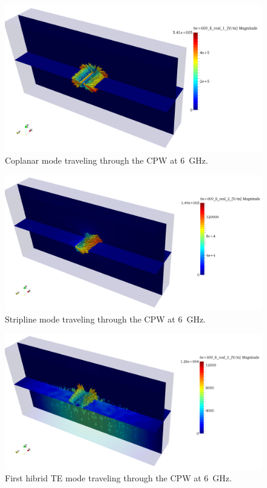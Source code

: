 \begin{figure}[h!]
\centering
\includegraphics[width=13.4cm]{CPWlin1}
\caption{Coplanar mode traveling through the CPW at 6~GHz.}
\label{fig:CPWlin1}
\end{figure}
\begin{figure}[h!]
\centering
\includegraphics[width=13.4cm]{CPWlin2}
\caption{Stripline mode traveling through the CPW at 6~GHz.}
\label{fig:CPWlin2}
\end{figure}
\begin{figure}[h!]
\centering
\includegraphics[width=13.4cm]{CPWlin3}
\caption{First hibrid TE mode traveling through the CPW at 6~GHz.}
\label{fig:CPWlin3}
\end{figure}

